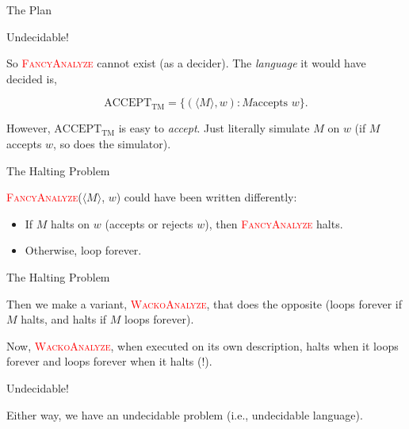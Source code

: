 \documentclass[12pt,compress]{beamer}
\newcommand{\func}[1]{\textcolor{red}{\textsc{#1}}}
\newcommand{\str}[1]{$\langle #1 \rangle$}
\begin{document}
\begin{frame}{The Plan}

  

\end{frame}

\begin{frame}{Undecidable!}

  So \func{FancyAnalyze} cannot exist (as a decider). The \textit{language}
  it would have decided is,

  \begin{equation*}
    \text{ACCEPT}_{\text{TM}} = \{ (\langle M \rangle, w) : M \text{
      accepts } w\}.
  \end{equation*}

  \vskip 0.25in

  However, $\text{ACCEPT}_{\text{TM}}$ is easy to \textit{accept}. Just
  literally simulate $M$ on $w$ (if $M$ accepts $w$, so does the
  simulator).

\end{frame}

\begin{frame}{The Halting Problem}

  \func{FancyAnalyze}(\str{M}, $w$) could have been written differently:

  \begin{itemize}

  \item If $M$ halts on $w$ (accepts or rejects $w$), then \func{FancyAnalyze} halts.

  \item Otherwise, loop forever.

  \end{itemize}

\end{frame}

\begin{frame}{The Halting Problem}

  Then we make a variant, \func{WackoAnalyze}, that does the opposite
  (loops forever if $M$ halts, and halts if $M$ loops forever).

  \vskip 0.25in

  Now, \func{WackoAnalyze}, when executed on its own description,
  halts when it loops forever and loops forever when it halts (!).

\end{frame}

\begin{frame}{Undecidable!}

  Either way, we have an undecidable problem (i.e., undecidable
  language).

\end{frame}
\end{document}
